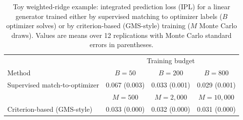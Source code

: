 \begin{table}[H]
\centering
\caption{Toy weighted-ridge example: integrated prediction loss (IPL) for a linear generator trained either by supervised matching to optimizer labels ($B$ optimizer solves) or by criterion-based (GMS-style) training ($M$ Monte Carlo draws). Values are means over 12 replications with Monte Carlo standard errors in parentheses.}
\label{tab:toy-gms-ipl}
\begin{tabular}{lccc}
\hline
 & \multicolumn{3}{c}{Training budget}\\
Method & $B{=}50$ & $B{=}200$ & $B{=}800$\\
\hline
Supervised match-to-optimizer & 0.067 (0.003) & 0.033 (0.001) & 0.029 (0.001) \\
\hline
 & $M{=}500$ & $M{=}2{,}000$ & $M{=}10{,}000$\\
\hline
Criterion-based (GMS-style) & 0.033 (0.000) & 0.032 (0.000) & 0.031 (0.000) \\
\hline
\end{tabular}
\end{table}
